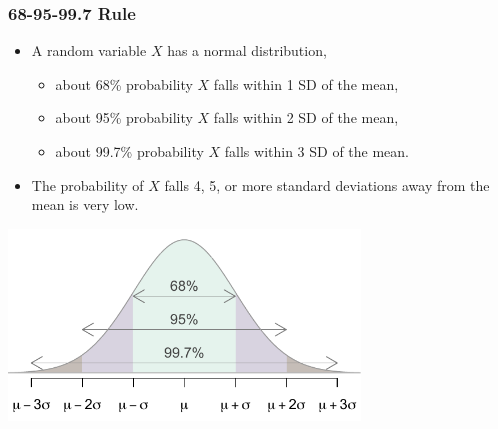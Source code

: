 \documentclass[slidestop,compress,mathserif]{beamer}
\begin{document}
\begin{frame}
\frametitle{68-95-99.7 Rule}

\begin{itemize}

\item A random variable $X$ has a normal distribution,
\begin{itemize}
\item about 68\% probability $X$ falls within 1 SD of the mean,
\item about 95\% probability $X$ falls within 2 SD of the mean,
\item about 99.7\% probability $X$ falls within 3 SD of the mean.
\end{itemize}

\item The probability of $X$ falls 4, 5, or more standard deviations away from the mean is very low.

\end{itemize}

\begin{center}
\includegraphics[width=0.7\textwidth]{figures/6895997}
\end{center}

\end{frame}
\end{document}
